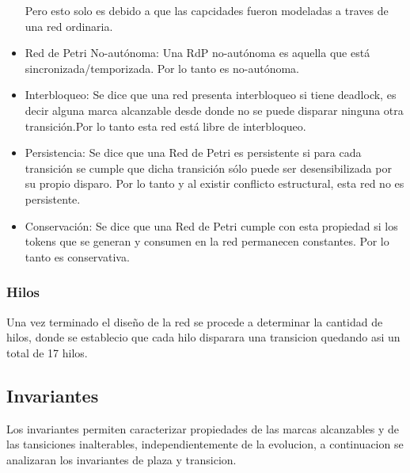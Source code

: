 \documentclass{article}
\begin{document}
\begin{itemize}
		Pero esto solo es debido a que las capcidades fueron modeladas a traves de una red ordinaria.
		\item Red de Petri No-autónoma: Una RdP no-autónoma es aquella que está 
		sincronizada/temporizada. Por lo tanto es no-autónoma.
		\item Interbloqueo: Se dice que una red presenta interbloqueo si tiene deadlock, 
		es decir alguna marca alcanzable desde donde no se puede disparar ninguna otra 
		transición.Por lo tanto esta red está libre de interbloqueo.
		\item Persistencia: Se dice que una Red de Petri es persistente si para cada 
		transición se cumple que dicha transición sólo puede ser desensibilizada por 
		su propio disparo. Por lo tanto y al existir conflicto estructural, esta red 
		no es persistente.
		\item Conservación: Se dice que una Red de Petri cumple con esta propiedad si 
		los tokens que se generan y consumen en la red permanecen constantes. Por lo 
		tanto es conservativa.
	\end{itemize}
	\subsubsection{Hilos}
	Una vez terminado el diseño de la red se procede a determinar la cantidad de hilos, donde se establecio que cada hilo disparara una transicion quedando asi un total de 17 hilos.
	\subsection{Invariantes}
	Los invariantes permiten caracterizar propiedades de las marcas alcanzables
	y de las tansiciones inalterables, independientemente de la evolucion, a continuacion se analizaran los invariantes de plaza y transicion.
\end{document}

